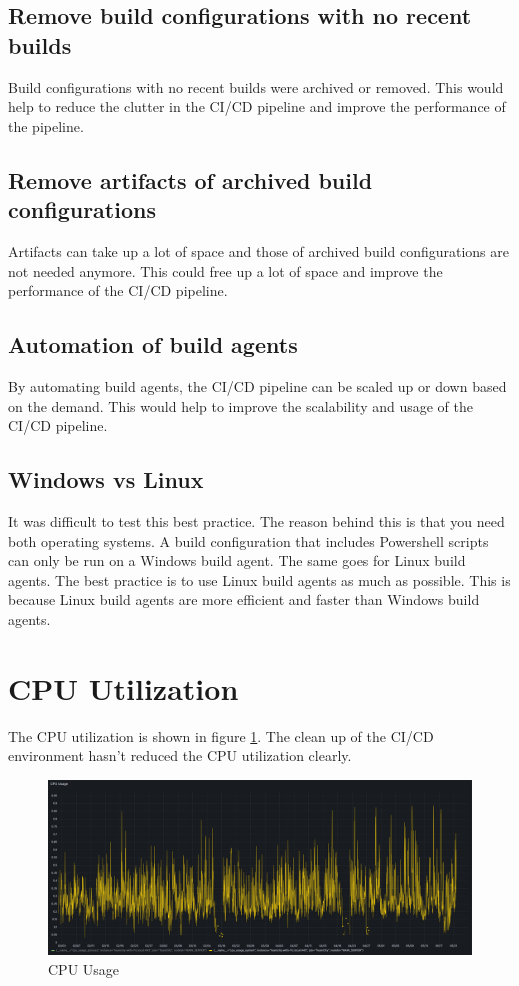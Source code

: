 \subsection{Remove build configurations with no recent builds}%
\label{sub:remove-build-configurations-with-no-recent-builds}
Build configurations with no recent builds were archived or removed. This would help to reduce the clutter in the CI/CD pipeline and improve the performance of the pipeline.

\subsection{Remove artifacts of archived build configurations}%
\label{sub:remove-artifacts-of-archived-build-configurations}
Artifacts can take up a lot of space and those of archived build configurations are not needed anymore. This could free up a lot of space and improve the performance of the CI/CD pipeline.

\subsection{Automation of build agents}%
\label{sub:automation-of-build-agents}
By automating build agents, the CI/CD pipeline can be scaled up or down based on the demand. This would help to improve the scalability and usage of the CI/CD pipeline.

\subsection{Windows vs Linux}%
\label{sub:windows-vs-linux}
It was difficult to test this best practice. The reason behind this is that you need both operating systems. A build configuration that includes Powershell scripts can only be run on a Windows build agent. The same goes for Linux build agents. The best practice is to use Linux build agents as much as possible. This is because Linux build agents are more efficient and faster than Windows build agents.


\section{CPU Utilization}%
\label{sec:cpu-utilization}

The CPU utilization is shown in figure \ref{fig:cpu}. The clean up of the CI/CD environment hasn't reduced the CPU utilization clearly.

\begin{figure}[htbp]
    \centering
    \includegraphics[width=\textwidth]{graphics/cpu.png}
    \caption{CPU Usage}
    \label{fig:cpu}
\end{figure}

